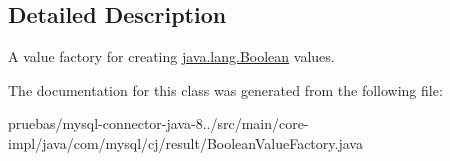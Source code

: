 \subsection{Detailed Description}
A value factory for creating \mbox{\hyperlink{}{java.\+lang.\+Boolean}} values. 

The documentation for this class was generated from the following file\+:\begin{DoxyCompactItemize}
\item 
pruebas/mysql-\/connector-\/java-\/8../src/main/core-\/impl/java/com/mysql/cj/result/Boolean\+Value\+Factory.\+java\end{DoxyCompactItemize}
